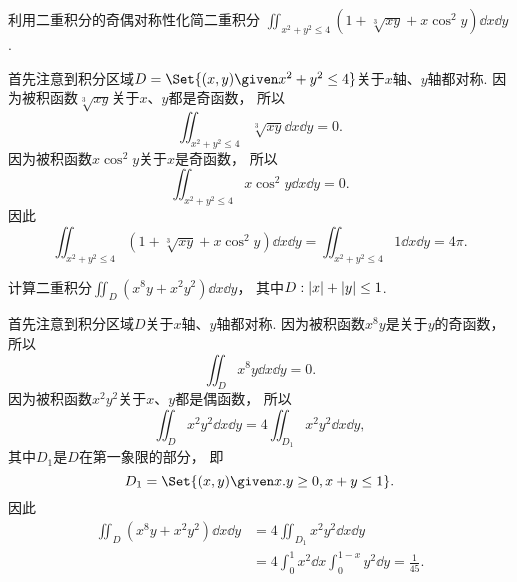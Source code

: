 \begin{example}
利用二重积分的奇偶对称性化简二重积分
\(\iint_{x^2+y^2\leq4} (1+\sqrt[3]{xy}+x \cos^2y) \dd{x}\dd{y}\).
\begin{solution}
首先注意到积分区域\(D = \Set{ (x,y) \given x^2+y^2\leq4 }\)关于\(x\)轴、\(y\)轴都对称.
因为被积函数\(\sqrt[3]{xy}\)关于\(x\)、\(y\)都是奇函数，
所以\begin{equation*}
	\iint_{x^2+y^2\leq4} \sqrt[3]{xy} \dd{x}\dd{y} = 0.
\end{equation*}
因为被积函数\(x \cos^2y\)关于\(x\)是奇函数，
所以\begin{equation*}
	\iint_{x^2+y^2\leq4} x \cos^2y \dd{x}\dd{y} = 0.
\end{equation*}
因此\begin{equation*}
	\iint_{x^2+y^2\leq4} (1+\sqrt[3]{xy}+x \cos^2y) \dd{x}\dd{y}
	= \iint_{x^2+y^2\leq4} 1 \dd{x}\dd{y}
	= 4\pi.
\end{equation*}
\end{solution}
\end{example}
\begin{example}
计算二重积分\(\iint_D (x^8y+x^2y^2) \dd{x}\dd{y}\)，
其中\(D: \abs{x}+\abs{y}\leq1\).
\begin{solution}
首先注意到积分区域\(D\)关于\(x\)轴、\(y\)轴都对称.
因为被积函数\(x^8y\)是关于\(y\)的奇函数，
所以\begin{equation*}
	\iint_D x^8y \dd{x}\dd{y} = 0.
\end{equation*}
因为被积函数\(x^2y^2\)关于\(x\)、\(y\)都是偶函数，
所以\begin{equation*}
	\iint_D x^2y^2 \dd{x}\dd{y}
	= 4 \iint_{D_1} x^2y^2 \dd{x}\dd{y},
\end{equation*}
其中\(D_1\)是\(D\)在第一象限的部分，
即\begin{equation*}
	D_1 = \Set{ (x,y) \given x.y\geq0,x+y\leq1 }.
\end{equation*}
因此\begin{align*}
	\iint_D (x^8y+x^2y^2) \dd{x}\dd{y}
	&= 4 \iint_{D_1} x^2y^2 \dd{x}\dd{y} \\
	&= 4 \int_0^1 x^2 \dd{x} \int_0^{1-x} y^2 \dd{y}
	= \frac1{45}.
\end{align*}
\end{solution}
\end{example}

